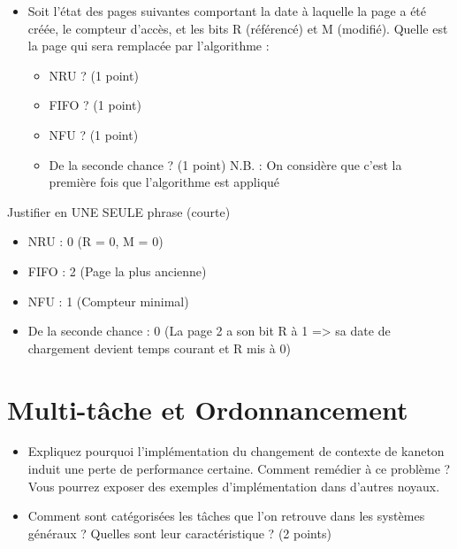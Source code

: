 \begin{itemize}
  \item Soit l'\'etat des pages suivantes comportant la date \`a laquelle la page a \'et\'e cr\'e\'ee, le compteur d'acc\`es, et les bits R (r\'ef\'erenc\'e) et M (modifi\'e). Quelle est la page qui sera remplac\'ee par l'algorithme :
  \begin{itemize}
    \item NRU ? (1 point)
    \item FIFO ? (1 point)
    \item NFU ? (1 point)
    \item De la seconde chance ? (1 point)
    \newline N.B. : On consid\`ere que c'est la premi\`ere fois que l'algorithme est appliqu\'e
  \end{itemize}
\end{itemize}
Justifier en UNE SEULE phrase (courte)
    
\begin{correction}

\begin{itemize}
    \item NRU : 0 (R = 0, M = 0)
    \item FIFO  : 2 (Page la plus ancienne)
    \item NFU : 1 (Compteur minimal)
    \item De la seconde chance : 0 (La page 2 a son bit R \`a 1 => sa date de chargement devient temps courant et R mis \`a 0)
\end{itemize}

\end{correction}

\section{{Multi-t\^ache et Ordonnancement}
         {\hfill{} }}

\begin{itemize}
  \item Expliquez pourquoi l'impl\'ementation du changement de contexte de kaneton induit une perte de performance certaine. Comment rem\'edier \`a ce probl\`eme ? Vous pourrez exposer des exemples d'impl\'ementation dans d'autres noyaux.
\end{itemize}

\begin{itemize}
  \item Comment sont cat\'egoris\'ees les t\^aches que l'on retrouve dans les syst\`emes g\'en\'eraux ? Quelles sont leur caract\'eristique ? (2 points)
\end{itemize}

